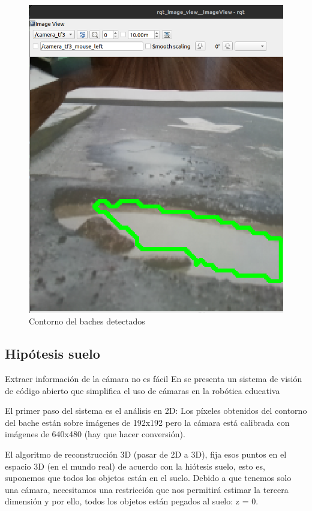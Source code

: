 \begin{figure}[ht!]
\begin{minipage}{0.4\linewidth}
		\includegraphics[width=\linewidth]{figs/cap6/contornobache2.png}
	\end{minipage}
	\caption{Contorno del baches detectados}
	\label{fig:contornobache}
\end{figure}

\subsection{Hipótesis suelo}
\label{subsec:softwarehsuelo}

Extraer información de la cámara no es fácil
En \cite{vega19d} se presenta un sistema de visión de código abierto que simplifica el uso de cámaras en la robótica educativa

El primer paso del sistema es el análisis en 2D: Los píxeles obtenidos del contorno del bache están sobre imágenes de 192x192 pero la cámara está calibrada con imágenes de 640x480 (hay que hacer conversión). 

El algoritmo de reconstrucción 3D (pasar de 2D a 3D), fija esos puntos en el espacio 3D (en el mundo real) de acuerdo con la hiótesis suelo, esto es, suponemos que todos los objetos están en el suelo. Debido a que tenemos solo una cámara, necesitamos una restricción que nos permitirá estimar la tercera dimensión y por ello, todos los objetos están pegados al suelo: z = 0.

